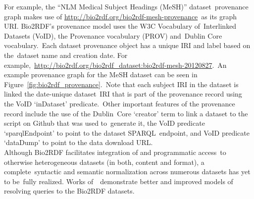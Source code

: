   \noindent For example, the ``NLM Medical Subject Headings (MeSH)'' dataset\
  provenance graph makes use of \url{http://bio2rdf.org/bio2rdf-mesh-provenance}\
  as its graph URI. Bio2RDF's provenance model uses the W3C Vocabulary of\
  Interlinked Datasets (VoID), the Provenance vocabulary (PROV) and\
  Dublin Core vocabulary.\
  Each dataset provenance object has a unique IRI and label based on the\
  dataset name and creation date. For example,\
  \url{http://bio2rdf.org/bio2rdf_dataset:bio2rdf-mesh-20120827}.\
  An example provenance graph for the MeSH dataset can be seen in Figure~\ref{fig:bio2rdf_provenance}.\
  Note that each subject IRI in the dataset is linked the date-unique dataset\
  IRI that is part of the provenance record using the VoID `inDataset' predicate.\
  Other important features of the provenance record include the use of the Dublin\
  Core `creator' term to link a dataset to the script on Github that was used to\
  generate it, the VoID predicate `sparqlEndpoint' to point to the dataset SPARQL\
  endpoint, and VoID predicate `dataDump' to point to the data download URL.\\
  
  \noindent Although Bio2RDF facilitates integration of and programmatic access\
  to otherwise heterogeneous datasets (in both, content and format), a complete\
  syntactic and semantic normalization across numerous datasets has yet to be\
  fully realized. Works of~\citep{ansell_model_2011, callahan_ontology-based_2013}\
  demonstrate better and improved models of resolving queries to the Bio2RDF datasets.\\
